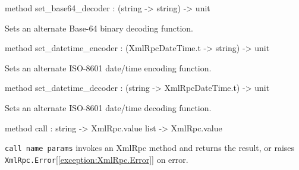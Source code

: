\documentclass[11pt]{article}
\begin{document}
\begin{ocamldocobjectend}
\begin{ocamldocdescription}
\end{ocamldocdescription}


\label{method:XmlRpc.client.set-underscorebase64-underscoredecoder}\begin{ocamldoccode}
method set_base64_decoder : (string -> string) -> unit
\end{ocamldoccode}
\begin{ocamldocdescription}
Sets an alternate Base-64 binary decoding function.


\end{ocamldocdescription}


\label{method:XmlRpc.client.set-underscoredatetime-underscoreencoder}\begin{ocamldoccode}
method set_datetime_encoder : (XmlRpcDateTime.t -> string) -> unit
\end{ocamldoccode}
\begin{ocamldocdescription}
Sets an alternate ISO-8601 date/time encoding function.


\end{ocamldocdescription}


\label{method:XmlRpc.client.set-underscoredatetime-underscoredecoder}\begin{ocamldoccode}
method set_datetime_decoder : (string -> XmlRpcDateTime.t) -> unit
\end{ocamldoccode}
\begin{ocamldocdescription}
Sets an alternate ISO-8601 date/time decoding function.


\end{ocamldocdescription}


\label{method:XmlRpc.client.call}\begin{ocamldoccode}
method call : string -> XmlRpc.value list -> XmlRpc.value
\end{ocamldoccode}
\begin{ocamldocdescription}
{\tt{call name params}} invokes an XmlRpc method and returns the result,
      or raises {\tt{XmlRpc.Error}}[\ref{exception:XmlRpc.Error}] on error.


\end{ocamldocdescription}
\end{ocamldocobjectend}
\end{document}
